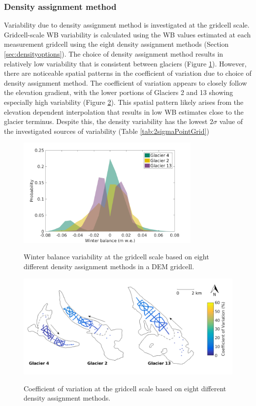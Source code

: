 \documentclass{sfuthesis}
\begin{document}
\subsubsection{Density assignment method}

Variability due to density assignment method is investigated at the gridcell scale. Gridcell-scale WB variability is calculated using the WB values estimated at each measurement gridcell using the eight density assignment methods (Section \ref{sec:densityoptions}). The choice of density assignment method results in relatively low variability that is consistent between glaciers (Figure \ref{fig:SWEvar_Density_hist}). However, there are noticeable spatial patterns in the coefficient of variation due to choice of density assignment method. The coefficient of variation appears to closely follow the elevation gradient, with the lower portions of Glaciers 2 and 13 showing especially high variability (Figure \ref{fig:SWEvar_Density_map}). This spatial pattern likely arises from the elevation dependent interpolation that results in low WB estimates close to the glacier terminus. Despite this, the density variability has the lowest $2\sigma$ value of the investigated sources of variability (Table  \ref{tab:2sigmaPointGrid})

\begin{figure}
	\centering
	\includegraphics[width =0.8\textwidth]{SWEvarDensityHIST.png}\\
	\caption{Winter balance variability at the gridcell scale based on eight different density assignment methods in a DEM gridcell.}
	\label{fig:SWEvar_Density_hist}
\end{figure}

\begin{figure}
	\centering
	\includegraphics[width =\textwidth]{Map_cellstd_density.png}\\
	\caption{Coefficient of variation at the gridcell scale based on eight different density assignment methods.}
	\label{fig:SWEvar_Density_map}
\end{figure}
\end{document}
